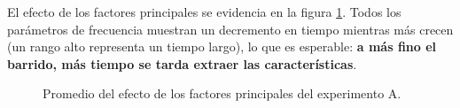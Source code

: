 El efecto de los factores principales se evidencia en la figura \ref{tab:ME-A}. Todos los parámetros de frecuencia muestran un decremento en tiempo mientras más crecen (un rango alto representa un tiempo largo), lo que es esperable: \textbf{a más fino el barrido, más tiempo se tarda extraer las características}. 

\begin{figure}[H]
    \centering
\caption{Promedio del efecto de los factores principales del experimento A.}
\label{tab:ME-A}
\end{figure}

